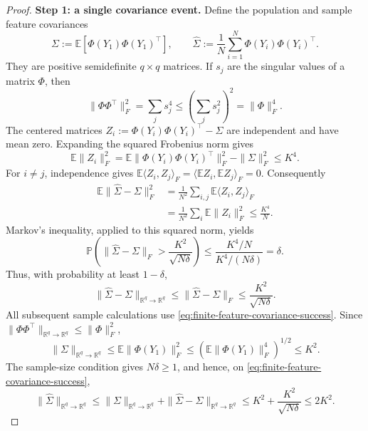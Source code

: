 \begin{proof}
\noindent\textbf{Step 1: a single covariance event.}
Define the population and sample feature covariances
\begin{equation}
 \Sigma:=\mathbb E[\Phi(Y_1)\Phi(Y_1)^\top],\qquad
 \widehat\Sigma:=\frac1N\sum_{i=1}^N\Phi(Y_i)\Phi(Y_i)^\top.
 \label{eq:finite-feature-covariances}
\end{equation}
They are positive semidefinite $q\times q$ matrices. If $s_j$ are the
singular values of a matrix $\Phi$, then
\[
 \|\Phi\Phi^\top\|_F^2=\sum_js_j^4
 \le\left(\sum_js_j^2\right)^2=\|\Phi\|_F^4.
\]
The centered matrices
$Z_i:=\Phi(Y_i)\Phi(Y_i)^\top-\Sigma$ are independent and have mean zero.
Expanding the squared Frobenius norm gives
\[
 \mathbb E\|Z_i\|_F^2
 =\mathbb E\|\Phi(Y_i)\Phi(Y_i)^\top\|_F^2-\|\Sigma\|_F^2
 \le K^4.
\]
For $i\ne j$, independence gives
$\mathbb E\langle Z_i,Z_j\rangle_F
=\langle\mathbb EZ_i,\mathbb EZ_j\rangle_F=0$.
Consequently
\begin{align*}
 \mathbb E\|\widehat\Sigma-\Sigma\|_F^2
 &=\frac1{N^2}\sum_{i,j}\mathbb E\langle Z_i,Z_j\rangle_F\\
 &=\frac1{N^2}\sum_i\mathbb E\|Z_i\|_F^2\le\frac{K^4}{N}.
\end{align*}
Markov's inequality, applied to this squared norm, yields
\[
 \mathbb P\left(\|\widehat\Sigma-\Sigma\|_F>
                   \frac{K^2}{\sqrt{N\delta}}\right)
 \le\frac{K^4/N}{K^4/(N\delta)}=\delta.
\]
Thus, with probability at least $1-\delta$,
\begin{equation}
\label{eq:finite-feature-covariance-success}
 \|\widehat\Sigma-\Sigma\|_{\mathbb R^q\to\mathbb R^q}
 \le\|\widehat\Sigma-\Sigma\|_F
 \le\frac{K^2}{\sqrt{N\delta}}.
\end{equation}
All subsequent sample calculations use
\eqref{eq:finite-feature-covariance-success}.
Since $\|\Phi\Phi^\top\|_{\mathbb R^q\to\mathbb R^q}\le\|\Phi\|_F^2$,
\[
 \|\Sigma\|_{\mathbb R^q\to\mathbb R^q}\le\mathbb E\|\Phi(Y_1)\|_F^2
 \le(\mathbb E\|\Phi(Y_1)\|_F^4)^{1/2}\le K^2.
\]
The sample-size condition gives $N\delta\ge1$, and hence, on
\eqref{eq:finite-feature-covariance-success},
\[
 \|\widehat\Sigma\|_{\mathbb R^q\to\mathbb R^q}
 \le\|\Sigma\|_{\mathbb R^q\to\mathbb R^q}+\|\widehat\Sigma-\Sigma\|_{\mathbb R^q\to\mathbb R^q}
 \le K^2+\frac{K^2}{\sqrt{N\delta}}\le2K^2.
\]


\end{proof}
